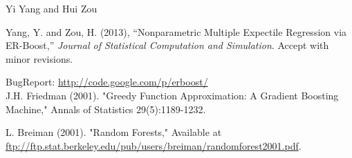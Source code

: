 \documentclass[a4paper]{book}
\begin{document}
%
\begin{Author}\relax
Yi Yang  and Hui Zou 
\end{Author}
%
\begin{References}\relax
Yang, Y. and Zou, H. (2013), ``Nonparametric Multiple Expectile Regression via ER-Boost,'' \emph{Journal of Statistical Computation and Simulation}. Accept with minor revisions.

BugReport: \url{http://code.google.com/p/erboost/}\\{}
J.H. Friedman (2001). "Greedy Function Approximation: A Gradient Boosting
Machine," Annals of Statistics 29(5):1189-1232.

L. Breiman (2001). "Random Forests," Available at \url{ftp://ftp.stat.berkeley.edu/pub/users/breiman/randomforest2001.pdf}.

\end{References}
%
\begin{SeeAlso}\relax
\end{SeeAlso}
\end{document}
